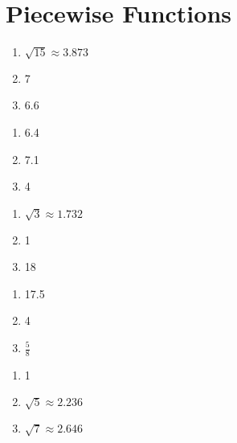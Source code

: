 \section*{Piecewise Functions}
\begin{multicols}{3}
\begin{enumerate}
    \item $\sqrt{15} \approx 3.873$
    \item 7
    \item 6.6
\end{enumerate}	\setcounter{Review}{\value{enumi}}
\end{multicols}
\begin{multicols}{3}
\begin{enumerate}	\setcounter{enumi}{\value{Review}}
    \item 6.4
    \item 7.1
	\item 4
\end{enumerate}	\setcounter{Review}{\value{enumi}}
\end{multicols}
\begin{multicols}{3}
\begin{enumerate}	\setcounter{enumi}{\value{Review}}
    \item $\sqrt{3} \approx 1.732$
    \item 1
    \item 18
\end{enumerate}	\setcounter{Review}{\value{enumi}}
\end{multicols}
\begin{multicols}{3}
\begin{enumerate}	\setcounter{enumi}{\value{Review}}
    \item 17.5
    \item 4
    \item $\frac{5}{8}$
\end{enumerate}	\setcounter{Review}{\value{enumi}}
\end{multicols}
\begin{multicols}{3}
\begin{enumerate}	\setcounter{enumi}{\value{Review}}
    \item 1
    \item $\sqrt{5} \approx 2.236$
    \item $\sqrt{7} \approx 2.646$
\end{enumerate}
\end{multicols}

\newpage

